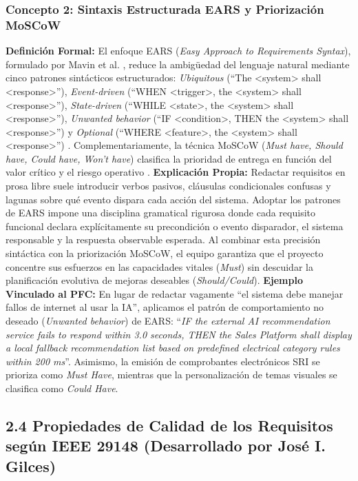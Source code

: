 \subsubsection{Concepto 2: Sintaxis Estructurada EARS y Priorización MoSCoW}
\textbf{Definición Formal:} El enfoque EARS (\textit{Easy Approach to Requirements Syntax}), formulado por Mavin et al. \cite{mavin2009ears}, reduce la ambigüedad del lenguaje natural mediante cinco patrones sintácticos estructurados: \textit{Ubiquitous} (``The <system> shall <response>''), \textit{Event-driven} (``WHEN <trigger>, the <system> shall <response>''), \textit{State-driven} (``WHILE <state>, the <system> shall <response>''), \textit{Unwanted behavior} (``IF <condition>, THEN the <system> shall <response>'') y \textit{Optional} (``WHERE <feature>, the <system> shall <response>'') \cite{mavin2009ears}. Complementariamente, la técnica MoSCoW (\textit{Must have, Should have, Could have, Won't have}) clasifica la prioridad de entrega en función del valor crítico y el riesgo operativo \cite{ireb2023, wiegers2013}.
\textbf{Explicación Propia:} Redactar requisitos en prosa libre suele introducir verbos pasivos, cláusulas condicionales confusas y lagunas sobre qué evento dispara cada acción del sistema. Adoptar los patrones de EARS impone una disciplina gramatical rigurosa donde cada requisito funcional declara explícitamente su precondición o evento disparador, el sistema responsable y la respuesta observable esperada. Al combinar esta precisión sintáctica con la priorización MoSCoW, el equipo garantiza que el proyecto concentre sus esfuerzos en las capacidades vitales (\textit{Must}) sin descuidar la planificación evolutiva de mejoras deseables (\textit{Should/Could}).
\textbf{Ejemplo Vinculado al PFC:} En lugar de redactar vagamente ``el sistema debe manejar fallos de internet al usar la IA'', aplicamos el patrón de comportamiento no deseado (\textit{Unwanted behavior}) de EARS: ``\textit{IF the external AI recommendation service fails to respond within 3.0 seconds, THEN the Sales Platform shall display a local fallback recommendation list based on predefined electrical category rules within 200 ms}''. Asimismo, la emisión de comprobantes electrónicos SRI se prioriza como \textit{Must Have}, mientras que la personalización de temas visuales se clasifica como \textit{Could Have}.
\subsection{2.4 Propiedades de Calidad de los Requisitos según IEEE 29148 (Desarrollado por José I. Gilces)}
